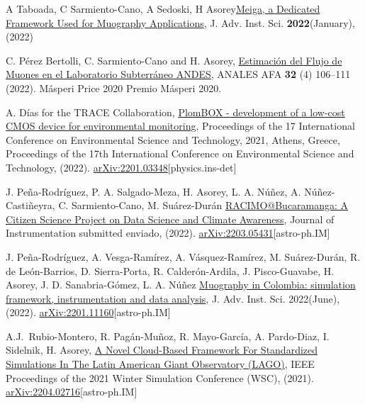 \begin{etaremune}
\item {} A Taboada, C Sarmiento-Cano, A Sedoski, H Asorey\href{https://doi.org/10.31526/jais.2022.266}{Meiga, a Dedicated Framework Used for Muography Applications},  J. Adv. Inst. Sci. {\textbf{2022}}(January), (2022) %

\item {} C. Pérez Bertolli, C. Sarmiento-Cano and H. Asorey, \href{https://afan.df.uba.ar/journal/index.php/analesafa/article/view/2300}{Estimación del Flujo de Muones en el Laboratorio Subterráneo ANDES}, ANALES AFA {\textbf{32}} (4) 106--111 (2022). \ifeng Másperi Price 2020 \else Premio Másperi 2020\fi.

\item {} A. Días for the TRACE Collaboration, \href{}{PlomBOX - development of a low-cost CMOS device for environmental monitoring}, \en Proceedings of the 17 International Conference on Environmental Science and Technology, 2021, Athens, Greece, \in Proceedings of the 17th International Conference on Environmental Science and Technology, (2022). \href{http://arxiv.org/abs/2201.03348}{arXiv:2201.03348}[physics.ins-det]

\item {} J. Peña-Rodríguez, P. A. Salgado-Meza, H. Asorey, L. A. Núñez, A. Núñez-Castiñeyra, C. Sarmiento-Cano, M. Suárez-Durán \href{}{RACIMO@Bucaramanga: A Citizen Science Project on Data Science and Climate Awareness}, Journal of Instrumentation \ifeng submitted \else enviado\fi, (2022). \href{http://arxiv.org/abs/2203.05431}{arXiv:2203.05431}[astro-ph.IM]

\item {} J. Peña-Rodríguez, A. Vesga-Ramírez, A. Vásquez-Ramírez, M. Suárez-Durán, R. de León-Barrios, D. Sierra-Porta, R. Calderón-Ardila, J. Pisco-Guavabe, H. Asorey, J. D. Sanabria-Gómez, L. A. Núñez \href{https://doi.org/10.31526/jais.2022.271}{Muography in Colombia: simulation framework, instrumentation and data analysis}, J. Adv. Inst. Sci. 2022(June), (2022). \href{ http://arxiv.org/abs/2201.11160}{arXiv:2201.11160}[astro-ph.IM]

\item {} A.J.\ Rubio-Montero, R. Pagán-Muñoz, R. Mayo-García, A. Pardo-Diaz, I. Sidelnik, H. Asorey, \href{https://doi.org/10.1109/WSC52266.2021.9715360}{A Novel Cloud-Based Framework For Standardized Simulations In The Latin American Giant Observatory (LAGO)}, \en IEEE Proceedings of the 2021 Winter Simulation Conference (WSC), (2021). \href{http://arxiv.org/abs/2204.02716}{arXiv:2204.02716}[astro-ph.IM]


\end{etaremune}
